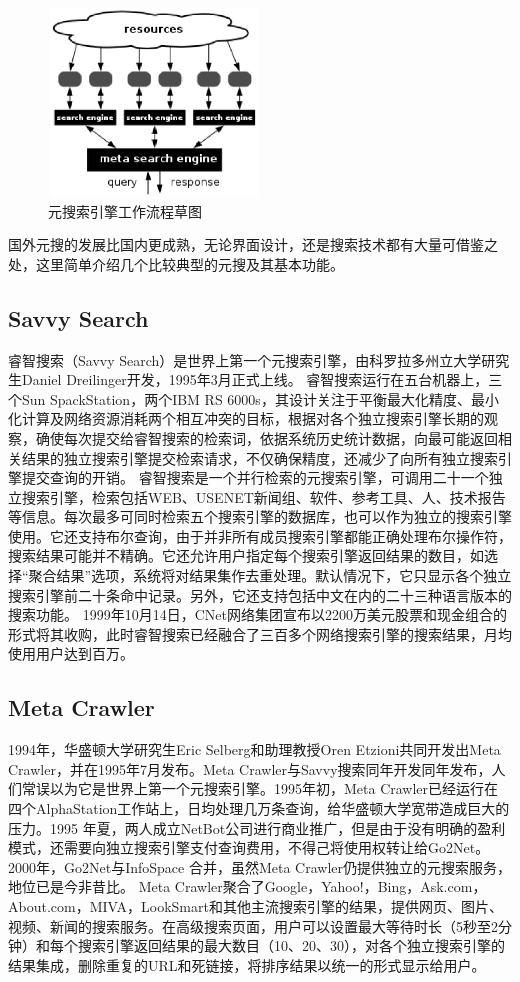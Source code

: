 \begin{figure}[ht]
  \centering
  \includegraphics[width=0.5\textwidth,height=5cm]{figures/MetaSE.eps}
  \caption{元搜索引擎工作流程草图}\label{fig:metase}
\end{figure}

国外元搜的发展比国内更成熟，无论界面设计，还是搜索技术都有大量可借鉴之处，这里简单介绍几个比较典型的元搜及其基本功能。

\subsection{Savvy Search}
睿智搜索（Savvy Search）是世界上第一个元搜索引擎，由科罗拉多州立大学研究生Daniel Dreilinger开发，1995年3月正式上线。
睿智搜索运行在五台机器上，三个Sun SpackStation，两个IBM RS 6000s，其设计关注于平衡最大化精度、最小化计算及网络资源消耗两个相互冲突的目标，根据对各个独立搜索引擎长期的观察，确使每次提交给睿智搜索的检索词，依据系统历史统计数据，向最可能返回相关结果的独立搜索引擎提交检索请求，不仅确保精度，还减少了向所有独立搜索引擎提交查询的开销。
睿智搜索是一个并行检索的元搜索引擎，可调用二十一个独立搜索引擎，检索包括WEB、USENET新闻组、软件、参考工具、人、技术报告等信息。每次最多可同时检索五个搜索引擎的数据库，也可以作为独立的搜索引擎使用。它还支持布尔查询，由于并非所有成员搜索引擎都能正确处理布尔操作符，搜索结果可能并不精确。它还允许用户指定每个搜索引擎返回结果的数目，如选择“聚合结果”选项，系统将对结果集作去重处理。默认情况下，它只显示各个独立搜索引擎前二十条命中记录。另外，它还支持包括中文在内的二十三种语言版本的搜索功能。
1999年10月14日，CNet网络集团宣布以2200万美元股票和现金组合的形式将其收购，此时睿智搜索已经融合了三百多个网络搜索引擎的搜索结果，月均使用用户达到百万。

\subsection{Meta Crawler}
1994年，华盛顿大学研究生Eric Selberg和助理教授Oren Etzioni共同开发出Meta Crawler，并在1995年7月发布。Meta Crawler与Savvy搜索同年开发同年发布，人们常误以为它是世界上第一个元搜索引擎。1995年初，Meta Crawler已经运行在四个AlphaStation工作站上，日均处理几万条查询，给华盛顿大学宽带造成巨大的压力。1995 年夏，两人成立NetBot公司进行商业推广，但是由于没有明确的盈利模式，还需要向独立搜索引擎支付查询费用，不得己将使用权转让给Go2Net。2000年，Go2Net与InfoSpace 合并，虽然Meta Crawler仍提供独立的元搜索服务，地位已是今非昔比。
Meta Crawler聚合了Google，Yahoo!，Bing，Ask.com，About.com，MIVA，LookSmart和其他主流搜索引擎的结果，提供网页、图片、视频、新闻的搜索服务。在高级搜索页面，用户可以设置最大等待时长（5秒至2分钟）和每个搜索引擎返回结果的最大数目（10、20、30），对各个独立搜索引擎的结果集成，删除重复的URL和死链接，将排序结果以统一的形式显示给用户。

